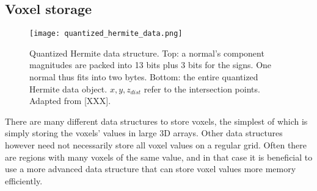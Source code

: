 \subsection{Voxel storage}

\begin{wrapfigure}{R}{0.5\textwidth}
\texttt{[image: quantized\_hermite\_data.png]}
\caption{Quantized Hermite data structure. Top: a normal's component magnitudes are packed into 13 bits plus 3 bits for the signs. One normal thus fits into two bytes. Bottom: the entire quantized Hermite data object. $x,y,z_{dist}$ refer to the intersection points. Adapted from [XXX].}
\label{fig:quantized_hermite_data}
\end{wrapfigure}

There are many different data structures to store voxels, the simplest of which is simply storing the voxels' values in large 3D arrays.
Other data structures however need not necessarily store all voxel values on a regular grid. Often there are regions with many voxels of the same value, and
in that case it is beneficial to use a more advanced data structure that can store voxel values more memory efficiently.



